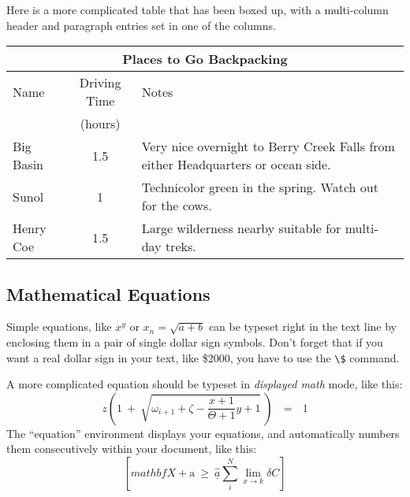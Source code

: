 Here is a more complicated table that has been boxed up, with a multi-column
header and paragraph entries set in one of the columns.
\begin{table}[H]
\centering
\begin{tabular}{lcp{3.5in}}
\toprule
\multicolumn{3}{c}{Places to Go Backpacking}\\ 
\hline
%
Name & Driving Time & Notes\\
     & (hours)      &\\ 
\midrule
Big Basin & 1.5 & 
Very nice overnight to Berry Creek Falls from
either Headquarters or ocean side.\\ 
%
Sunol & 1 & 
Technicolor green in the spring.  Watch out for the cows.\\ 
%
Henry Coe & 1.5 & 
Large wilderness nearby suitable for multi-day treks.\\ 
%
\bottomrule
\end{tabular}
\end{table}

\subsection{Mathematical Equations}
Simple equations, like $x^y$ or $x_n = \sqrt{a + b}$ can be typeset right
in the text line by enclosing them in a pair of single dollar sign symbols.
Don't forget that if you want a real dollar sign in your text, like \$2000,
you have to use the \verb+\$+ command.

A more complicated equation should be typeset in {\em displayed math\/} mode,
like this:
\[
z \left( 1 \ +\  \sqrt{\omega_{i+1} + \zeta -\frac{x+1}{\Theta +1} y + 1} 
\ \right)
\ \ \ =\ \ \  1
\]
The ``equation'' environment displays your equations, and automatically
numbers them consecutively within your document, like this:
\begin{equation}
\left[
mathbf{X} + \mathrm{a} \ \geq\ 
\underline{\hat a} \sum_i^N \lim_{x \rightarrow k} \delta C
\right]
\end{equation}